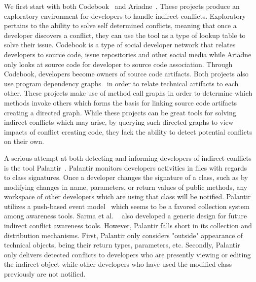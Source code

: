 \documentclass[conference]{IEEEtran}
\begin{document}
We first start with both Codebook~\cite{Begel:2010:CDE} and 
Ariadne~\cite{Trainer:2005:BGT}. These projects produce an exploratory
environment for developers to handle indirect conflicts. Exploratory
pertains to the ability to solve self determined conflicts, meaning that
once a developer discovers a conflict, they can use the tool as a type of
lookup table to solve their issue. Codebook is a type of social developer
network that relates developers to source code, issue repositories and
other social media while Ariadne only looks at source code for developer
to source code association. Through Codebook, developers become
owners of source code artifacts. Both projects also use program 
dependency graphs~\cite{Horwitz:1992:UPD}
in order to relate technical artifacts to each other. These projects make 
use of method call graphs in order to 
determine which methods invoke others which forms the basis for 
linking source code artifacts creating a directed graph. While these 
projects can be great tools 
for solving indirect conflicts which may arise, by querying such directed
graphs to view impacts of conflict creating code, they lack the ability to
detect potential conflicts on their own.

A serious attempt at both detecting and informing developers of
indirect conflicts is the tool Palantir~\cite{Sarma:2007:TSA}. Palantir
monitors developers activities in files with regards to class signatures.
Once a developer changes the signature of a class, such as by modifying changes
in name, parameters, or return values of public methods, any workspace
of other developers which are using that class will be notified. Palantir utilizes
a push-based event model~\cite{Fitzpatrick:2002:SPA} which seems to be
a favored collection system among awareness tools. Sarma et al.
~\cite{Sarma:2007:TSA} also
developed a generic design for future indirect conflict awareness tools. 
However, Palantir falls short in its collection and distribution
mechanisms. First, Palantir only considers "outside" appearance of technical
objects, being their return types, parameters, etc. Secondly, Palantir 
only delivers
detected conflicts to developers who are presently viewing or editing
the indirect object while other developers who have used the modified 
class previously are not notified.
\end{document}
